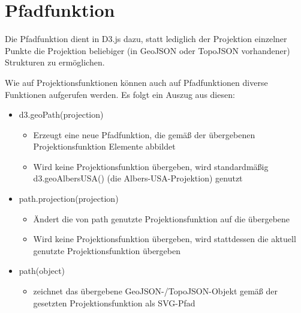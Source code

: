 \section{Pfadfunktion}

Die Pfadfunktion dient in D3.js dazu, statt lediglich der Projektion einzelner Punkte die Projektion beliebiger (in GeoJSON oder TopoJSON vorhandener) Strukturen zu ermöglichen.

Wie auf Projektionsfunktionen können auch auf Pfadfunktionen diverse Funktionen aufgerufen werden. Es folgt ein Auszug aus diesen:

\begin{itemize}
    \item d3.geoPath(projection)
            \begin{itemize}
                \item Erzeugt eine neue Pfadfunktion, die gemäß der übergebenen Projektionsfunktion Elemente abbildet
                \item Wird keine Projektionsfunktion übergeben, wird standardmäßig d3.geoAlbersUSA() (die Albers-USA-Projektion) genutzt
            \end{itemize}
    \item path.projection(projection)
            \begin{itemize}
                \item Ändert die von path genutzte Projektionsfunktion auf die übergebene
                \item Wird keine Projektionsfunktion übergeben, wird stattdessen die aktuell genutzte Projektionsfunktion übergeben
            \end{itemize}
    \item path(object)
            \begin{itemize}
                \item zeichnet das übergebene GeoJSON-/TopoJSON-Objekt gemäß der gesetzten Projektionsfunktion als SVG-Pfad
            \end{itemize}
\end{itemize}



